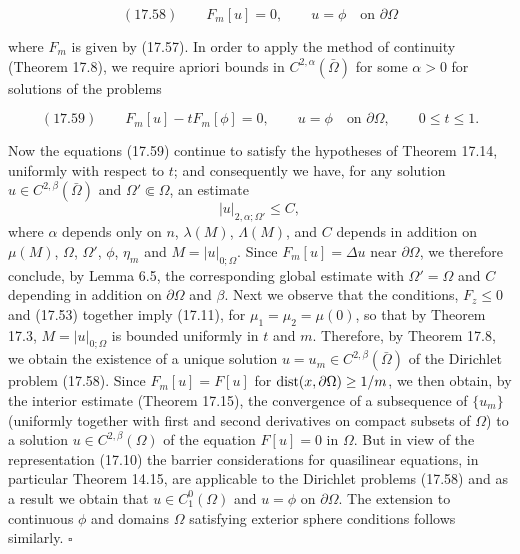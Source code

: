 \[
(17.58)\qquad F_m[u]=0,\qquad u=\phi\quad \text{on }\partial\Omega
\]

\begin{flushleft}
where $F_m$ is given by (17.57). In order to apply the method of continuity (Theorem
17.8), we require apriori bounds in $C^{2,\alpha}(\bar\Omega)$ for some $\alpha>0$ for solutions of the
problems
\end{flushleft}

\[
(17.59)\qquad F_m[u]-tF_m[\phi]=0,\qquad u=\phi\quad \text{on }\partial\Omega,\qquad 0\leq t\leq 1.
\]


Now the equations (17.59) continue to satisfy the hypotheses of Theorem 17.14,
uniformly with respect to $t$; and consequently we have, for any solution $u \in C^{2,\beta}(\bar\Omega)$
and $\Omega' \Subset \Omega$, an estimate
\[
|u|_{2,\alpha;\Omega'} \leq C,
\]
where $\alpha$ depends only on $n$, $\lambda(M)$, $\Lambda(M)$, and $C$ depends in addition on $\mu(M)$, $\Omega$, $\Omega'$, $\phi$, $\eta_m$ and $M = |u|_{0;\Omega}$. Since $F_m[u] = \Delta u$ near $\partial\Omega$, we therefore conclude, by Lemma 6.5, the corresponding global estimate with $\Omega' = \Omega$ and $C$ depending in addition on $\partial\Omega$ and $\beta$. Next we observe that the conditions, $F_z \leq 0$ and (17.53) together imply (17.11), for $\mu_1 = \mu_2 = \mu(0)$, so that by Theorem 17.3, $M = |u|_{0;\Omega}$ is bounded uniformly in $t$ and $m$. Therefore, by Theorem 17.8, we obtain the existence of a unique solution $u = u_m \in C^{2,\beta}(\bar\Omega)$ of the Dirichlet problem (17.58). Since $F_m[u] = F[u]$ for $\operatorname{dist}(x, \partial\Omega) \geq 1/m$, we then obtain, by the interior estimate (Theorem 17.15), the convergence of a subsequence of $\{u_m\}$ (uniformly together with first and second derivatives on compact subsets of $\Omega$) to a solution $u \in C^{2,\beta}(\Omega)$ of the equation $F[u] = 0$ in $\Omega$. But in view of the representation (17.10) the barrier considerations for quasilinear equations, in particular Theorem 14.15, are applicable to the Dirichlet problems (17.58) and as a result we obtain that $u \in C^0_1(\Omega)$ and $u = \phi$ on $\partial\Omega$. The extension to continuous $\phi$ and domains $\Omega$ satisfying exterior sphere conditions follows similarly. $\square$

